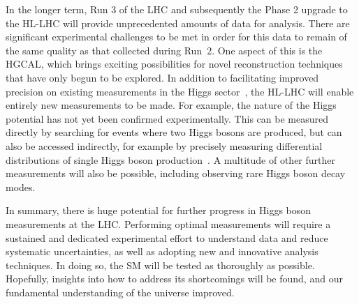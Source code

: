 In the longer term, Run 3 of the LHC and subsequently the Phase 2 upgrade to the HL-LHC 
will provide unprecedented amounts of data for analysis.
There are significant experimental challenges to be met in order for this data 
to remain of the same quality as that collected during Run~2.
One aspect of this is the HGCAL, which brings exciting possibilities for novel reconstruction
techniques that have only begun to be explored.
In addition to facilitating improved precision on existing measurements 
in the Higgs sector~\cite{FutureYR}, the HL-LHC will enable entirely new measurements to be made.
For example, the nature of the Higgs potential has not yet been confirmed experimentally.
This can be measured directly by searching for events where two Higgs bosons are produced, 
but can also be accessed indirectly, 
for example by precisely measuring differential distributions 
of single Higgs boson production~\cite{JonnoPAS}.
A multitude of other further measurements will also be possible, 
including observing rare Higgs boson decay modes.

In summary, there is huge potential for further progress in Higgs boson measurements at the LHC.
Performing optimal measurements will require a sustained and dedicated experimental effort
to understand data and reduce systematic uncertainties, 
as well as adopting new and innovative analysis techniques.
In doing so, the SM will be tested as thoroughly as possible.
Hopefully, insights into how to address its shortcomings will be found,
and our fundamental understanding of the universe improved.
